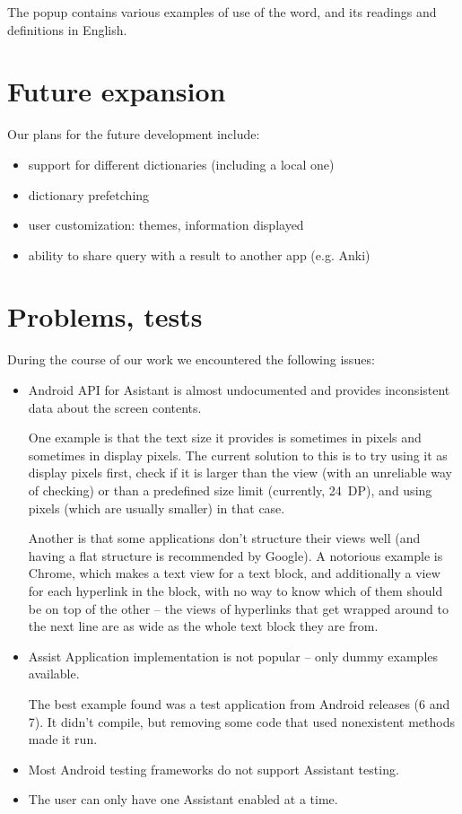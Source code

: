 \documentclass[11pt,a4paper]{article}
\begin{document}
The popup contains various examples of use of the word,
and its readings and definitions in English.

\newpage

\section{Future expansion}

Our plans for the future development include:
\begin{itemize}
    \item support for different dictionaries (including a local one)
    \item dictionary prefetching
    \item user customization: themes, information displayed
    \item ability to share query with a result to another app (e.g. Anki)
\end{itemize}

\section{Problems, tests}

During the course of our work we encountered the following issues:
\begin{itemize}
    \item Android API for Asistant is almost undocumented
        and provides inconsistent data about the screen contents.

        One example is that the text size it provides
        is sometimes in pixels and sometimes in display pixels.
        The current solution to this is
        to try using it as display pixels first,
        check if it is larger than the view
        (with an unreliable way of checking)
        or than a predefined size limit (currently, 24~DP),
        and using pixels (which are usually smaller) in that case.

        Another is that some applications don't structure
        their views well (and having a flat structure is recommended
        by Google). A notorious example is Chrome,
        which makes a text view for a text block,
        and additionally a view for each hyperlink in the block,
        with no way to know which of them
        should be on top of the other --
        the views of hyperlinks
        that get wrapped around to the next line
        are as wide as the whole text block they are from.
        
    \item Assist Application implementation is not popular --
        only dummy examples available.

        The best example found was a test application
        from Android releases (6 and 7). It didn't compile,
        but removing some code that used nonexistent methods
        made it run.
    \item Most Android testing frameworks do not support Assistant testing.
    \item The user can only have one Assistant enabled at a time.
\end{itemize}
\end{document}
